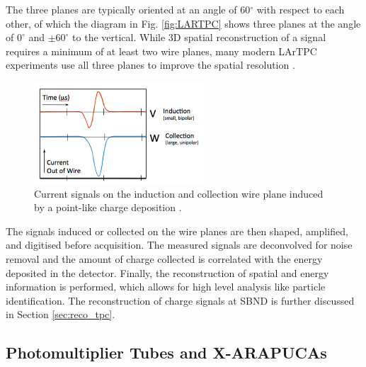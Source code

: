 The three planes are typically oriented at an angle of 60$^{\circ}$ with respect to each other, of which the diagram in Fig. \ref{fig:LARTPC} shows three planes at the angle of $0^{\circ}$ and $\pm60^{\circ}$ to the vertical.
While 3D spatial reconstruction of a signal requires a minimum of at least two wire planes, many modern LArTPC experiments use all three planes to improve the spatial resolution \cite{argoneut, icarus_det, ubooneDet, sbnd_det, protodune, dunefd_det}.

\begin{figure}[ht] 
\centering    
\includegraphics[width=0.57\textwidth]{wire_current}
\caption[Induced Currents on an Induction and a Collection Wire Plane]{
Current signals on the induction and collection wire plane induced by a point-like charge deposition \cite{argoneut}.
\hfill
\break
}
\label{fig:wire_current}
\end{figure}


The signals induced or collected on the wire planes are then shaped, amplified, and digitised before acquisition.
The measured signals are deconvolved for noise removal and the amount of charge collected is correlated with the energy deposited in the detector.
Finally, the reconstruction of spatial and energy information is performed, which allows for high level analysis like particle identification.
The reconstruction of charge signals at SBND is further discussed in Section \ref{sec:reco_tpc}.

\subsection{Photomultiplier Tubes and X-ARAPUCAs}
\label{sec:pmtarapuca}

